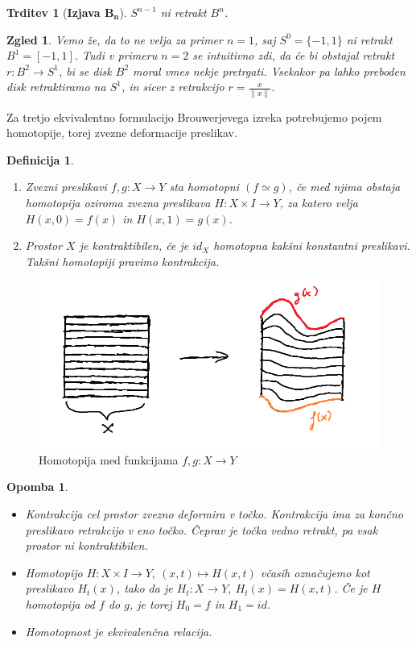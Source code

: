 \documentclass[10pt, a4paper]{article}
\newtheorem{trditev}[izr]{Trditev}
\newtheorem{defi}[izr]{Definicija}
\newenvironment{noticeB}{%
  \tcolorbox[%
  notitle,
  empty,
  enhanced,  %
  breakable,
  coltext=black,
  colback=white, 
  fontupper=\rmfamily,
  noparskip,
  sharp corners,
  boxrule=-1pt,  %
  frame hidden,
  left=7pt,  %
  right=7pt,
  top=5pt,
  bottom=5pt,
  before skip=2.5ex plus 2pt,
  after skip=2.5ex plus 2pt,
  borderline west = {1.5pt}{-0.1pt}{blue!30!black}, %
  overlay unbroken and last={%
    \draw[color=black, line width=1.25pt]
    ($(frame.south west)+(1.pt, -0.1pt)$) -- ++(2em, 0);
  }
  ]}
{\endtcolorbox}
\newenvironment{definicija}{\begin{noticeB}\begin{defi}}{%
\end{defi}\end{noticeB}}
\newtheorem*{opomba}{Opomba}
\newtheorem{zgled}[izr]{Zgled}
\begin{document}
\begin{trditev}[\textbf{Izjava $\mathbf{B_n}$}]
  $S^{n - 1}$ ni retrakt $B^n$.
\end{trditev}

\begin{zgled}
  Vemo že, da to ne velja za primer $n = 1$, saj $S^0 = \{-1, 1\}$ ni retrakt $B^1 = [-1, 1]$.
  Tudi v primeru $n = 2$ se intuitivno zdi, da če bi obstajal retrakt $r: B^2 \to S^1$, 
  bi se disk $B^2$ moral vmes nekje pretrgati.
  Vsekakor pa lahko preboden disk retraktiramo na $S^1$, in sicer z retrakcijo $r = \frac{x}{\|x\|}$.
\end{zgled}

Za tretjo ekvivalentno formulacijo Brouwerjevega izreka potrebujemo pojem homotopije, torej zvezne deformacije
preslikav.

\begin{definicija}
  \begin{enumerate}
    \item Zvezni preslikavi $f, g : X \to Y$ sta homotopni $(f \simeq g)$, če med njima obstaja homotopija 
    oziroma zvezna preslikava $H: X \times I \to Y$, za katero velja $H(x, 0) = f(x)$ in $H(x, 1) = g(x)$.
    \item Prostor $X$ je kontraktibilen, če je $id_X$ homotopna kakšni konstantni preslikavi.
    Takšni homotopiji pravimo kontrakcija.
  \end{enumerate}
\end{definicija}

\begin{figure}[htb!]
  \centering
  \includegraphics[scale=0.6]{homotopija1.png}
  \caption{Homotopija med funkcijama $f, g: X \to Y$}
\end{figure}

\begin{opomba}
  \begin{itemize}
    \item Kontrakcija cel prostor zvezno deformira v točko.
    Kontrakcija ima za končno preslikavo retrakcijo v eno točko.
    Čeprav je točka vedno retrakt, pa vsak prostor ni kontraktibilen.
    \item Homotopijo $H: X \times I \to Y,\ (x, t) \mapsto H(x, t)$ včasih označujemo kot preslikavo 
    $H_t(x)$, tako da je $H_t: X \to Y,\ H_t (x) = H(x, t)$. Če je $H$ homotopija od $f$ do $g$,
    je torej $H_0 = f$ in $H_1 = id$.
    \item Homotopnost je ekvivalenčna relacija.
  \end{itemize}
\end{opomba}
\end{document}
